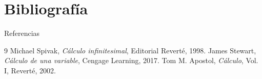 \documentclass[10pt, spanish]{beamer}
\begin{document}
	\section{Bibliografía}
	\begin{frame}{Referencias}
		\begin{thebibliography}{9}
			 Michael Spivak, \textit{Cálculo infinitesimal}, Editorial Reverté, 1998.
			 James Stewart, \textit{Cálculo de una variable}, Cengage Learning, 2017.
			 Tom M. Apostol, \textit{Cálculo}, Vol. I, Reverté, 2002.
		\end{thebibliography}
	\end{frame}
	
\end{document}
